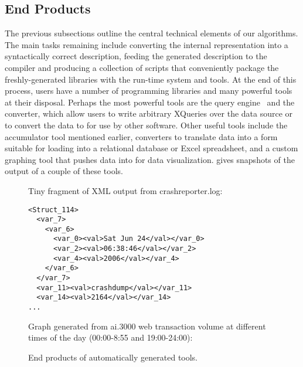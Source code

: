  

\subsection {End Products}

The previous subsections outline the central technical elements of our
algorithms.  The main tasks remaining include converting the internal
representation into a syntactically correct \pads{} description, feeding
the generated description to the \pads{} compiler and producing a 
collection of scripts that conveniently package the freshly-generated 
libraries with the \pads{} run-time system and tools.  At the end of 
this process, users have a number of programming libraries
and many powerful tools at their disposal.
Perhaps the most powerful tools are the \padx{} query 
engine~\cite{fernandez+:padx} and the \xml{} converter, which allow  
users to write arbitrary XQueries over the data source
or to convert the data to \xml{} for use by other software. Other
useful tools include the accumulator tool mentioned earlier,
converters to translate data into a form suitable for
loading into a relational database or Excel spreadsheet, and
a custom graphing tool that pushes data into  for data
visualization.
 gives snapshots of the output of a couple
of these tools. 

\begin{figure}

Tiny fragment of XML output from crashreporter.log:

\begin{center}
{\small
\begin{verbatim}
<Struct_114>
  <var_7>
    <var_6>
      <var_0><val>Sat Jun 24</val></var_0>
      <var_2><val>06:38:46</val></var_2>
      <var_4><val>2006</val></var_4>
    </var_6>
  </var_7>
  <var_11><val>crashdump</val></var_11>
  <var_14><val>2164</val></var_14>
...

\end{verbatim}
}

\end{center}
Graph generated from ai.3000 web transaction volume at different
times of the day (00:00-8:55 and 19:00-24:00):
\begin{center}

\caption{End products of automatically generated tools.} \shrink
\label{fig:final-products}
\end{center}
\end{figure}


